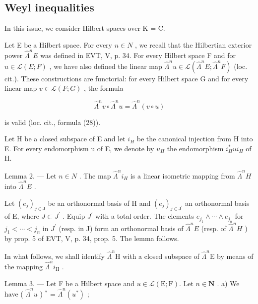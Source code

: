 \subsection{Weyl inequalities}

In this issue, we consider Hilbert spaces over K = C.

Let E be a Hilbert space. For every \(n \in N\) , we recall that the Hilbertian exterior power \(\hat{\Lambda}^{n}E\) was defined in EVT, V, p. 34. For every Hilbert space F and for \(u \in \mathcal{L}(E;F)\) , we have also defined the linear map \(\hat{\Lambda}^{n}u \in \mathcal{L}(\hat{\Lambda}^{n}E;\hat{\Lambda}^{n}F)\) (loc. cit.). These constructions are functorial: for every Hilbert space G and for every linear map \(v \in \mathcal{L}(F;G)\) , the formula

\[
\widehat {\Lambda} ^ {n} v \circ \widehat {\Lambda} ^ {n} u = \widehat {\Lambda} ^ {n} (v \circ u)
\]

is valid (loc. cit., formula (28)).

Let H be a closed subspace of E and let \(i_{H}\) be the canonical injection from H into E. For every endomorphism u of E, we denote by \(u_{H}\) the endomorphism \(i_{H}^{*}ui_{H}\) of H.

Lemma 2. --- Let \(n \in N\) . The map \(\hat{\Lambda}^{n}i_{H}\) is a linear isometric mapping from \(\hat{\Lambda}^{n}H\) into \(\hat{\Lambda}^{n}E\) .

Let \((e_{j})_{j\in\mathrm{J}}\) be an orthonormal basis of H and \((e_{j})_{j\in\mathrm{J}^{\prime}}\) an orthonormal basis of E, where \(J\subset J^{\prime}\) . Equip \(J^{\prime}\) with a total order. The elements \(e_{j_{1}}\wedge\cdots\wedge e_{j_{n}}\) for \(j_{1}<\cdots<j_{n}\) in \(J^{\prime}\) (resp. in J) form an orthonormal basis of \(\widehat{\Lambda}^{n}E\) (resp. of \(\widehat{\Lambda}^{n}H\) ) by prop. 5 of EVT, V, p. 34, prop. 5. The lemma follows.

In what follows, we shall identify \(\hat{\Lambda}^n\mathrm{H}\) with a closed subspace of \(\hat{\Lambda}^n\mathrm{E}\) by means of the mapping \(\hat{\Lambda}^n i_{\mathrm{H}}\) .

Lemma 3. --- Let F be a Hilbert space and \(u \in \mathcal{L}(\mathrm{E};\mathrm{F})\). Let \(n \in \mathbf{N}\) . a) We have ( \(\widehat{\Lambda}^n u\) ) \(^*\) = \(\widehat{\Lambda}^n (u^*)\) ;

